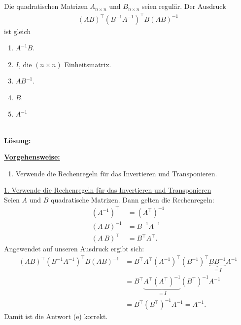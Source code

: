 \subsection*{}
Die quadratischen Matrizen $ A_{n \times n} $ und $ B_{n \times n} $ seien regulär.
Der Ausdruck
\begin{align*}
	(A B)^\top (B^{-1} A^{-1})^\top B (AB)^{-1}
\end{align*}
ist gleich
\renewcommand{\labelenumi}{(\alph{enumi})}
\begin{enumerate}
	\item 
	$ A^{-1} B $.
	\item 
	$ I $, die $ (n \times n) $ Einheitsmatrix.
	\item
	$ AB^{-1} $.
	\item
	$ B $.
	\item 
	$ A^{-1} $
\end{enumerate}
\ \\
\textbf{Lösung:}
\begin{mdframed}
\underline{\textbf{Vorgehensweise:}}
\renewcommand{\labelenumi}{\theenumi.}
\begin{enumerate}
\item Verwende die Rechenregeln für das Invertieren und Transponieren.
\end{enumerate}
\end{mdframed}

\underline{1. Verwende die Rechenregeln für das Invertieren und Transponieren}\\
Seien $ A $ und $ B $ quadratische Matrizen. Dann gelten die Rechenregeln:
\begin{align*}
	\left(A^{-1} \right)^\top &= \left(A^\top \right)^{-1}\\
	(A \ B)^{-1} &= B^{-1} A^{-1}\\
	(A \ B)^\top &= B^\top A^\top. 
\end{align*}
Angewendet auf unseren Ausdruck ergibt sich:
\begin{align*}
	(A B)^\top (B^{-1} A^{-1})^\top B (AB)^{-1}
	&=
	B^\top A^\top \left(A^{-1}\right)^\top \left(B^{-1}\right)^\top \underbrace{B  B^{-1}}_{=I} A^{-1}\\ 
	&=
	B^\top \underbrace{A^\top \left(A^\top\right)^{-1}}_{=I} \left(B^\top \right)^{-1}  A^{-1}\\
	&= 
	B^\top \left(B^\top \right)^{-1}  A^{-1} = A^{-1}.
\end{align*}
Damit ist die Antwort (e) korrekt.

\newpage
